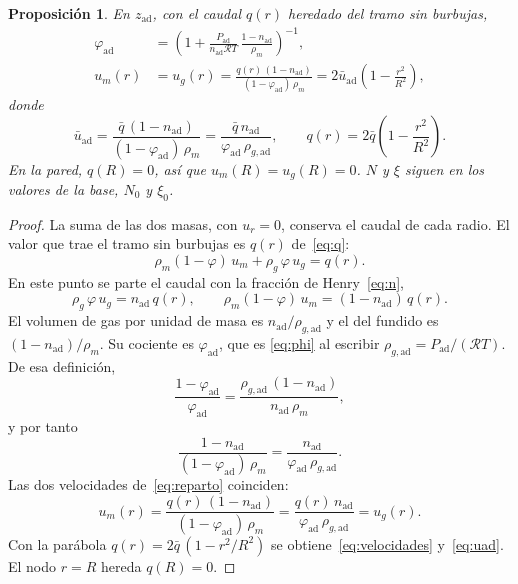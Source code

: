 \documentclass[11pt,a4paper]{article}
\newcommand{\ad}{\mathrm{ad}}
\newcommand{\Rv}{\mathcal{R}}
\theoremstyle{plain}
\newtheorem{proposicion}{Proposición}
\theoremstyle{definition}
\theoremstyle{remark}
\begin{document}
\begin{proposicion}
\label{prop:ad}
En \(z_{\ad}\), con el caudal \(q(r)\) heredado del tramo sin burbujas,
\begin{align}
\varphi_{\ad}
&=
\left(
1+\frac{P_{\ad}}{n_{\ad}\Rv T}\,\frac{1-n_{\ad}}{\rho_m}
\right)^{-1},
\label{eq:phi}\\[0.4em]
u_m(r)
&=
u_g(r)
=
\frac{q(r)\,(1-n_{\ad})}{(1-\varphi_{\ad})\,\rho_m}
=
2\bar u_{\ad}\left(1-\frac{r^2}{R^2}\right),
\label{eq:velocidades}
\end{align}
donde
\begin{equation}
\bar u_{\ad}
=
\frac{\bar q\,(1-n_{\ad})}{(1-\varphi_{\ad})\,\rho_m}
=
\frac{\bar q\, n_{\ad}}{\varphi_{\ad}\,\rho_{g,\ad}},
\qquad
q(r)=2\bar q\left(1-\frac{r^2}{R^2}\right).
\label{eq:uad}
\end{equation}
En la pared, \(q(R)=0\), así que \(u_m(R)=u_g(R)=0\).
\(N\) y \(\xi\) siguen en los valores de la base, \(N_0\) y \(\xi_0\).
\end{proposicion}

\begin{proof}
La suma de las dos masas, con \(u_r=0\), conserva el caudal de cada radio.
El valor que trae el tramo sin burbujas es \(q(r)\) de~\eqref{eq:q}:
\begin{equation}
\rho_m(1-\varphi)\,u_m+\rho_g\,\varphi\,u_g=q(r).
\label{eq:qtotal}
\end{equation}
En este punto se parte el caudal con la fracción de Henry~\eqref{eq:n},
\begin{equation}
\rho_g\,\varphi\,u_g=n_{\ad}\,q(r),
\qquad
\rho_m(1-\varphi)\,u_m=(1-n_{\ad})\,q(r).
\label{eq:reparto}
\end{equation}
El volumen de gas por unidad de masa es \(n_{\ad}/\rho_{g,\ad}\) y el del
fundido es \((1-n_{\ad})/\rho_m\). Su cociente es \(\varphi_{\ad}\), que es
\eqref{eq:phi} al escribir \(\rho_{g,\ad}=P_{\ad}/(\Rv T)\).
De esa definición,
\begin{equation}
\frac{1-\varphi_{\ad}}{\varphi_{\ad}}
=
\frac{\rho_{g,\ad}\,(1-n_{\ad})}{n_{\ad}\,\rho_m},
\end{equation}
y por tanto
\begin{equation}
\frac{1-n_{\ad}}{(1-\varphi_{\ad})\,\rho_m}
=
\frac{n_{\ad}}{\varphi_{\ad}\,\rho_{g,\ad}}.
\label{eq:igualdad}
\end{equation}
Las dos velocidades de~\eqref{eq:reparto} coinciden:
\begin{equation}
u_m(r)
=
\frac{q(r)\,(1-n_{\ad})}{(1-\varphi_{\ad})\,\rho_m}
=
\frac{q(r)\,n_{\ad}}{\varphi_{\ad}\,\rho_{g,\ad}}
=
u_g(r).
\end{equation}
Con la parábola \(q(r)=2\bar q\,(1-r^2/R^2)\) se obtiene~\eqref{eq:velocidades}
y~\eqref{eq:uad}. El nodo \(r=R\) hereda \(q(R)=0\).
\end{proof}
\end{document}
